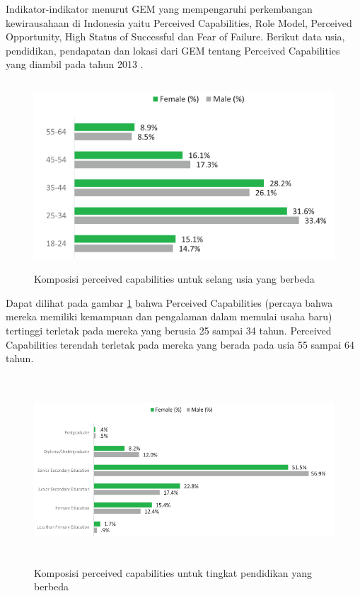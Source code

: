 Indikator-indikator menurut GEM yang mempengaruhi perkembangan kewirausahaan di Indonesia yaitu Perceived Capabilities, Role Model, Perceived Opportunity, High Status of Successful dan Fear of Failure. Berikut data usia, pendidikan, pendapatan dan lokasi dari GEM tentang Perceived Capabilities yang diambil pada tahun 2013 \cite{dataGEM}.


\begin{figure} [H]
	\centering  
	\includegraphics[width=14cm, height=7cm]{umurPC2013} 
	\caption[Komposisi perceived capabilities untuk selang usia yang berbeda]{Komposisi perceived capabilities untuk selang usia yang berbeda} 
	\label{fig:PCUmur} 
\end{figure}

Dapat dilihat pada gambar \ref{fig:PCUmur} bahwa Perceived Capabilities (percaya bahwa mereka memiliki kemampuan dan pengalaman dalam memulai usaha baru) tertinggi terletak pada mereka yang berusia 25 sampai 34 tahun. Perceived Capabilities terendah terletak pada mereka yang berada pada usia 55 sampai 64 tahun.

\begin{figure} [H]
	\centering  
	\includegraphics[width=14cm, height=7cm]{pendidikanPC2013} 
	\caption[Komposisi perceived capabilities untuk tingkat pendidikan yang berbeda]{Komposisi perceived capabilities untuk tingkat pendidikan yang berbeda} 
	\label{fig:PCPendidikan} 
\end{figure}

